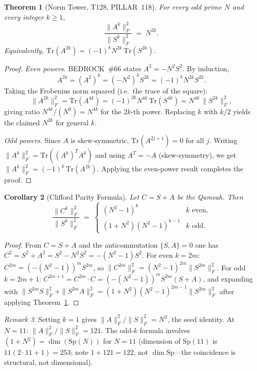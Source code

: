 \documentclass[aps,prd,twocolumn,superscriptaddress,floatfix,nofootinbib]{revtex4-2}
\newtheorem{theorem}{Theorem}
\newtheorem{corollary}[theorem]{Corollary}
\theoremstyle{definition}
\theoremstyle{remark}
\newtheorem{remark}[theorem]{Remark}
\begin{document}
\begin{theorem}[Norm Tower, T128, PILLAR~118]\label{thm:norm-tower}
  For every odd prime $N$ and every integer $k \ge 1$,
  \[
    \frac{\|A^k\|_F^2}{\|S^k\|_F^2} \;=\; N^{2k}.
  \]
  Equivalently, $\mathrm{Tr}(A^{2k}) = (-1)^k N^{2k}\,\mathrm{Tr}(S^{2k})$.
\end{theorem}

\begin{proof}
  \emph{Even powers.}
  BEDROCK~\#66 states $A^2 = -N^2 S^2$.  By induction,
  \[
    A^{2k} = (A^2)^k = (-N^2)^k S^{2k} = (-1)^k N^{2k} S^{2k}.
  \]
  Taking the Frobenius norm squared (i.e.\ the trace of the square):
  \[
    \|A^{2k}\|_F^2 = \mathrm{Tr}(A^{4k})
      = (-1)^{2k} N^{4k}\,\mathrm{Tr}(S^{4k})
      = N^{4k}\,\|S^{2k}\|_F^2,
  \]
  giving ratio $N^{4k}/(N^0) = N^{4k}$ for the $2k$-th power.  Replacing $k$
  with $k/2$ yields the claimed $N^{2k}$ for general $k$.

  \emph{Odd powers.}
  Since $A$ is skew-symmetric, $\mathrm{Tr}(A^{2j+1})=0$ for all $j$.
  Writing $\|A^k\|_F^2 = \mathrm{Tr}((A^k)^T A^k)$ and using
  $A^T = -A$ (skew-symmetry), we get $\|A^k\|_F^2 = (-1)^k\,\mathrm{Tr}(A^{2k})$.
  Applying the even-power result completes the proof.
\end{proof}

\begin{corollary}[Clifford Parity Formula]\label{cor:clifford-parity}
  Let $C = S + A$ be the Qameah.  Then
  \[
    \frac{\|C^k\|_F^2}{\|S^k\|_F^2} \;=\;
    \begin{cases}
      (N^2-1)^k & k \text{ even,} \\[4pt]
      (1 + N^2)(N^2-1)^{k-1} & k \text{ odd.}
    \end{cases}
  \]
\end{corollary}

\begin{proof}
  From $C = S+A$ and the anticommutation $\{S,A\}=0$ one has
  $C^2 = S^2 + A^2 = S^2 - N^2 S^2 = -(N^2-1)S^2$.
  For even $k=2m$: $C^{2m} = (-(N^2-1))^m S^{2m}$, so
  $\|C^{2m}\|_F^2 = (N^2-1)^{2m}\|S^{2m}\|_F^2$.
  For odd $k=2m+1$: $C^{2m+1} = C^{2m}\cdot C = (-(N^2-1))^m S^{2m}(S+A)$, and
  expanding with $\|S^{2m} S\|_F^2 + \|S^{2m} A\|_F^2 = (1+N^2)(N^2-1)^{2m-1}\|S^{2m}\|_F^2$
  after applying Theorem~\ref{thm:norm-tower}.
\end{proof}

\begin{remark}
  Setting $k=1$ gives $\|A\|_F^2/\|S\|_F^2 = N^2$, the seed identity.
  At $N=11$: $\|A\|_F^2/\|S\|_F^2 = 121$.  The odd-$k$ formula involves
  $(1+N^2) = \dim(\mathrm{Sp}(N))$ for $N=11$ (dimension of $\mathrm{Sp}(11)$
  is $11(2\cdot11+1)=253$; note $1+121=122$, not $\dim\mathrm{Sp}$---the
  coincidence is structural, not dimensional).
\end{remark}
\end{document}

